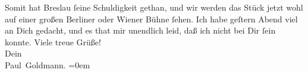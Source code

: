 \begin{ledgroupsized}[t]{13cm}
               Somit hat Breslau ſeine Schuldigkeit gethan,  und wir werden das Stück jetzt wohl \label{K_L02942-3v}\label{K_L02942-3h} auf einer großen Berliner oder Wiener Bühne ſehen. Ich habe geſtern{ }Abend viel an Dich {\pb}gedacht, und es
               that mir unendlich leid, daß ich nicht bei Dir ſein konnte.\pend
           \pstart
           Viele treue Grüße! {\\[\baselineskip]}Dein {\\[\baselineskip]}\spacefill\mbox{Paul Goldmann.}\pend
           \leftskip=0em{}
         
         \endnumbering{}\end{ledgroupsized}\begin{anhang}\end{anhang}\newcommand{\dateiname}{L02942}\newcommand{\titel}{Paul Goldmann an Arthur Schnitzler, 2. 12. [1900]}\newcommand{\editorInnen}{Martin Anton Müller und Laura Untner}
      